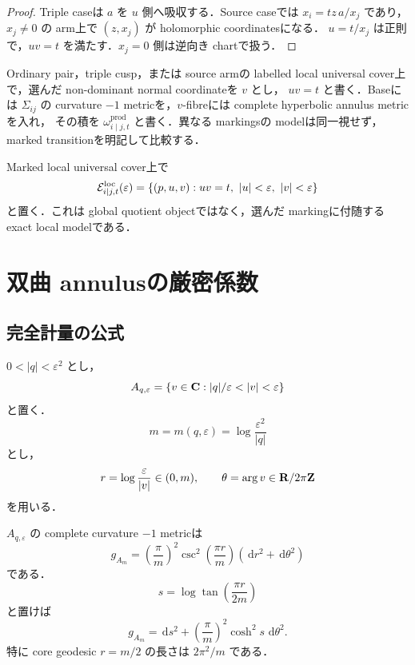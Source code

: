 \documentclass[a4paper,11pt]{ltjsarticle}
\numberwithin{equation}{section}
\theoremstyle{plain}
\theoremstyle{definition}
\theoremstyle{remark}
\newcommand{\eps}{\varepsilon}\newcommand{\dd}{\,\mathrm d}\newcommand{\ddc}{\sqrt{-1}\,\partial\bar\partial}
\begin{document}
\begin{proof}
Triple caseは $a$ を $u$ 側へ吸収する．Source caseでは $x_i=tz\,a/x_j$ であり，$x_j\ne0$ の arm上で $(z,x_j)$ が holomorphic coordinatesになる．
$u=t/x_j$ は正則で，$uv=t$ を満たす．$x_j=0$ 側は逆向き chartで扱う．
\end{proof}

\begin{definition}\label{sharp:def:marked-product-model}
Ordinary pair，triple cusp，または source armの labelled local universal cover上で，選んだ non-dominant normal coordinateを $v$ とし，
$uv=t$ と書く．Baseには $\Sigma_{ij}$ の curvature $-1$ metricを，$v$-fibreには complete hyperbolic annulus metricを入れ，
その積を $\omega^{\mathrm{prod}}_{i\mid j,t}$ と書く．異なる markingsの modelは同一視せず，marked transitionを明記して比較する．
\end{definition}

\begin{definition}\label{sharp:def:oriented-domain}
Marked local universal cover上で
\[
 \cE_{i\mid j,t}^{\mathrm{loc}}(\eps)
 =\{(p,u,v):uv=t,\ |u|<\eps,\ |v|<\eps\}
\]
と置く．これは global quotient objectではなく，選んだ markingに付随する exact local modelである．
\end{definition}

\section{双曲 annulusの厳密係数}\label{sharp:sec:annulus}

\subsection{完全計量の公式}

$0<|q|<\eps^2$ とし，
\[
 A_{q,\eps}=\{v\in\CC:|q|/\eps<|v|<\eps\}
\]
と置く．
\begin{equation}\label{sharp:eq:m-def}
 m=m(q,\eps)=\log\frac{\eps^2}{|q|}
\end{equation}
とし，
\[
 r=\log\frac{\eps}{|v|}\in(0,m),\qquad \theta=\arg v\in\RR/2\pi\ZZ
\]
を用いる．

\begin{proposition}\label{sharp:prop:annulus-formula}
$A_{q,\eps}$ の complete curvature $-1$ metricは
\begin{equation}\label{sharp:eq:annulus-metric}
 g_{A_m}
 =\left(\frac{\pi}{m}\right)^2
  \csc^2\left(\frac{\pi r}{m}\right)(\dd r^2+\dd\theta^2)
\end{equation}
である．
\begin{equation}\label{sharp:eq:s-coordinate}
 s=\log\tan\left(\frac{\pi r}{2m}\right)
\end{equation}
と置けば
\begin{equation}\label{sharp:eq:annulus-mandel}
 g_{A_m}=\dd s^2+\left(\frac{\pi}{m}\right)^2\cosh^2s\,\dd\theta^2.
\end{equation}
特に core geodesic $r=m/2$ の長さは $2\pi^2/m$ である．
\end{proposition}
\end{document}

